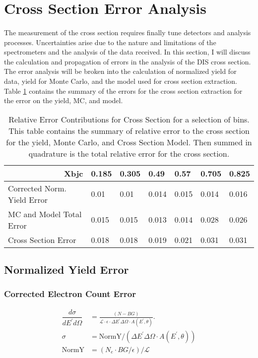 \section{Cross Section Error Analysis}
\paragraph{}The measurement of the cross section requires finally tune detectors and analysis processes. Uncertainties arise due to the nature and limitations of the spectrometers and the analysis of the data received. In this section, I will discuss the calculation and propagation of errors in the analysis of the DIS cross section. The error analysis will be broken into the calculation of normalized yield for data, yield for Monte Carlo, and the model used for cross section extraction. Table \ref{ET_sum} contains the summary of the errors for the cross section extraction for the error on the yield, MC, and model. 

\begin{table}[]
	\caption{Relative Error Contributions for Cross Section for a selection of bins. This table contains the summary of relative error to the cross section for the yield, Monte Carlo, and Cross Section Model. Then summed in quadrature is the total relative error for the cross section.}
	\label{ET_sum}
\begin{tabular}{|l|l|l|l|l|l|l|}
	\hline
	\multicolumn{1}{|r|}{Xbjc}        & \textbf{0.185} & \textbf{0.305} & \textbf{0.49} & \textbf{0.57} & \textbf{0.705} & \textbf{0.825} \\ \hline
	Corrected Norm. Yield Error       & 0.01           & 0.01           & 0.014         & 0.015         & 0.014          & 0.016          \\ \hline
	MC and Model Total Error & 0.015          & 0.015          & 0.013         & 0.014         & 0.028          & 0.026          \\ \hline
	Cross Section Error               & 0.018          & 0.018          & 0.019         & 0.021         & 0.031          & 0.031          \\ \hline
\end{tabular}
\end{table}

\subsection{Normalized Yield Error}
\subsubsection{Corrected Electron Count Error}
\begin{align}
\dfrac{d\sigma}{dE^{\prime}d\Omega} &= \frac{(N - BG)}{\mathscr{L} \cdot \epsilon \cdot \Delta E^{\prime} \Delta \Omega \cdot A(E^{\prime},\theta)}. \nonumber\\
\sigma &= \text{NormY}/\left(\Delta E^{\prime} \Delta \Omega \cdot A(E^{\prime},\theta)\right)\nonumber\\
\text{NormY} &= \left(N_e \cdot BG/\epsilon \right) / \mathscr{L}
\end{align}

